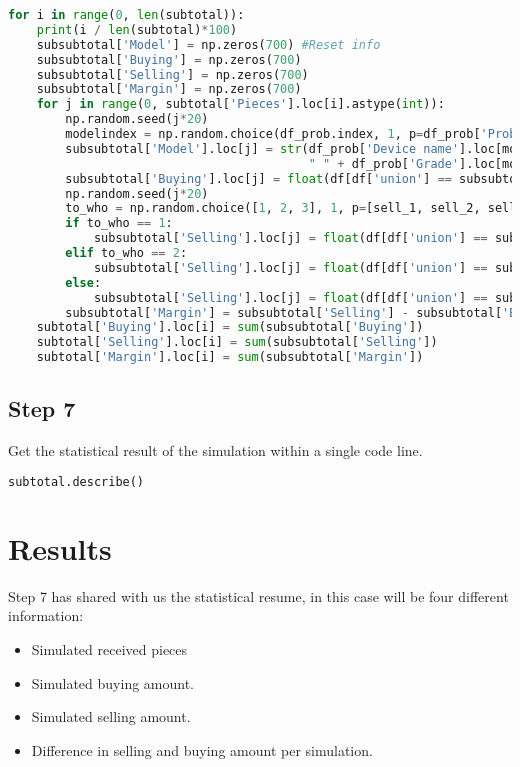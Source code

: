 \documentclass[11pt,a4paper,twocolumn]{article}
\begin{document}
\begin{lstlisting}[language=python]
for i in range(0, len(subtotal)):
    print(i / len(subtotal)*100)
    subsubtotal['Model'] = np.zeros(700) #Reset info
    subsubtotal['Buying'] = np.zeros(700)
    subsubtotal['Selling'] = np.zeros(700)
    subsubtotal['Margin'] = np.zeros(700)
    for j in range(0, subtotal['Pieces'].loc[i].astype(int)):
        np.random.seed(j*20)
        modelindex = np.random.choice(df_prob.index, 1, p=df_prob['Probability']) #Inidica el index del modelo
        subsubtotal['Model'].loc[j] = str(df_prob['Device name'].loc[modelindex[0]] +
                                          " " + df_prob['Grade'].loc[modelindex[0]]) #Indicate model and grading with index
        subsubtotal['Buying'].loc[j] = float(df[df['union'] == subsubtotal['Model'].loc[j]]['Buying price']) #Usa filtro para buscar el precio de compra
        np.random.seed(j*20)
        to_who = np.random.choice([1, 2, 3], 1, p=[sell_1, sell_2, sell_3])
        if to_who == 1:
            subsubtotal['Selling'].loc[j] = float(df[df['union'] == subsubtotal['Model'].loc[j]]['Selling price 1'])
        elif to_who == 2:
            subsubtotal['Selling'].loc[j] = float(df[df['union'] == subsubtotal['Model'].loc[j]]['Selling price 2'])
        else:
            subsubtotal['Selling'].loc[j] = float(df[df['union'] == subsubtotal['Model'].loc[j]]['Selling price 2'])
        subsubtotal['Margin'] = subsubtotal['Selling'] - subsubtotal['Buying'] #Venta menos compra
    subtotal['Buying'].loc[i] = sum(subsubtotal['Buying'])
    subtotal['Selling'].loc[i] = sum(subsubtotal['Selling'])
    subtotal['Margin'].loc[i] = sum(subsubtotal['Margin'])                   decimals = 0)
\end{lstlisting}

\subsection{Step 7}

Get the statistical result of the simulation within a single code line.

\begin{lstlisting}[language=python]
subtotal.describe()
\end{lstlisting}

\section{Results}

Step 7 has shared with us the statistical resume, in this case will be four different information:
\begin{itemize}
    \item Simulated received pieces
    \item Simulated buying amount.
    \item Simulated selling amount.
    \item Difference in selling and buying amount per simulation.
\end{itemize}
\end{document}

